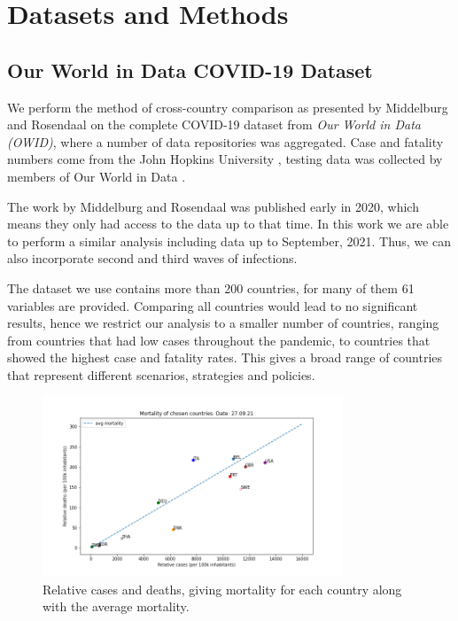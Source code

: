 \documentclass[a4paper,11pt]{article}
\begin{document}
\section{Datasets and Methods}

\subsection*{Our World in Data COVID-19 Dataset}

We perform the method of cross-country comparison as presented by Middelburg and Rosendaal \cite{middelburg2020covid} on the 
complete COVID-19 dataset from \textit{Our World in Data (OWID)}, where a number of data repositories was aggregated. Case and fatality numbers
come from the John Hopkins University \cite{dong2020interactive}, testing data was collected by members of Our World in Data \cite{testinghasell2020}.

The work by Middelburg and Rosendaal was published early in 2020, which means they only had access to the data up to that time.
In this work we are able to perform a similar analysis including data up to September, 2021. Thus, we can also incorporate second and third waves of infections.

The dataset we use contains more than 200 countries, for many of them 61 variables are provided. Comparing all countries would lead
to no significant results, hence we restrict our analysis to a smaller number of countries, ranging from countries that had low cases throughout the pandemic, to countries that showed the highest case and fatality rates. This gives a broad range of countries that
represent different scenarios, strategies and policies.

\begin{figure}[htb]
    \centering
    \includegraphics[width=0.8\textwidth]{figures/mortality_plot.png}
    \caption{Relative cases and deaths, giving mortality for each country along with the average mortality.}
    \label{fig:mortality}
\end{figure}
\end{document}
